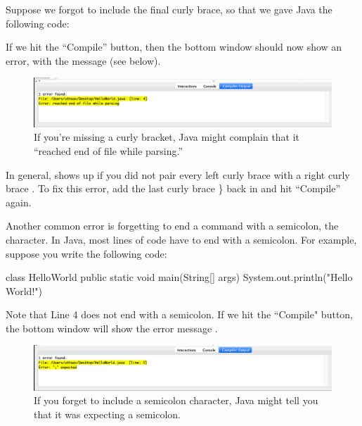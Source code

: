 Suppose we forgot to include the final curly brace, so that we gave Java the following code:
\begin{code}
class HelloWorld {
    public static void main(String[] args) {
        System.out.println("Hello World!");
    }
\end{code}
If we hit the  ``Compile'' button, then the bottom window should now show an error, with the message  (see below).
\begin{figure}
	\centering
	\includegraphics[width=\textwidth]{images/hello_world_error.png}
	\caption{If you're missing a curly bracket, Java might complain that it ``reached end of file while parsing.''}
	\label{fig:helloworld:sec:error}
\end{figure}
In general,  shows up if you did not pair every left curly brace \ic{\{} with a right curly brace \ic{\}}. To fix this error, add the last curly brace \} back in and hit ``Compile'' again.

Another common error is forgetting to end a command with a semicolon, the \ic{;} character. In Java, most lines of code have to end with a semicolon. For example, suppose you write the following code:
\begin{code}
class HelloWorld {
    public static void main(String[] args) {
        System.out.println("Hello World!")
    }
}
\end{code}
Note that Line 4 does not end with a semicolon. If we hit the ``Compile" button, the bottom window will show the error message .
\begin{figure}
	\centering
	\includegraphics[width=\textwidth]{images/hello_world_error2.png}
	\caption{If you forget to include a semicolon character, Java might tell you that it was expecting a semicolon.}
	\label{fig:helloworld:sec:error2}
\end{figure}

